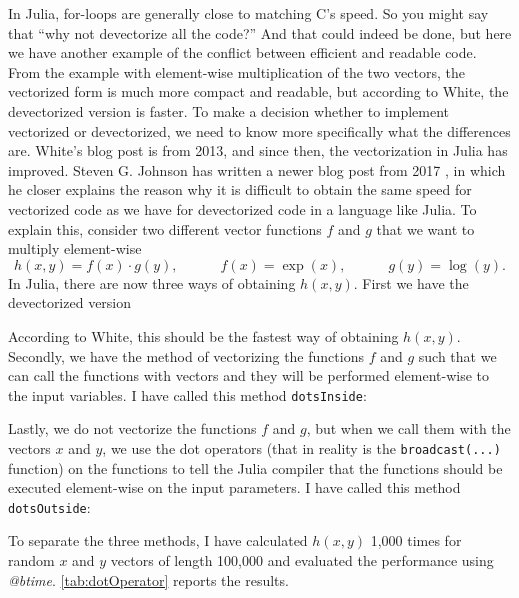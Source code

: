In Julia, for-loops are generally close to matching C's speed. So you might say that \enquote{why not devectorize all the code?} And that could indeed be done, but here we have another example of the conflict between efficient and readable code. From the example with element-wise multiplication of the two vectors, the vectorized form is much more compact and readable, but according to White, the devectorized version is faster. To make a decision whether to implement vectorized or devectorized, we need to know more specifically what the differences are. White's blog post is from 2013, and since then, the vectorization in Julia has improved. Steven G. Johnson has written a newer blog post from 2017 \emph{\citep{MoreDotsJuliaBlog}}, in which he closer explains the reason why it is difficult to obtain the same speed for vectorized code as we have for devectorized code in a language like Julia. To explain this, consider two different vector functions $f$ and $g$ that we want to multiply element-wise
\begin{equation*}
    h(x,y) = f(x) \cdot g(y), \hspace{3em} f(x) = \exp(x), \hspace{3em} g(y) = \log(y).
\end{equation*}
In Julia, there are now three ways of obtaining $h(x,y)$. First we have the devectorized version 

According to White, this should be the fastest way of obtaining $h(x,y)$. Secondly, we have the method of vectorizing the functions $f$ and $g$ such that we can call the functions with vectors and they will be performed element-wise to the input variables. I have called this method \texttt{dotsInside}:

Lastly, we do not vectorize the functions $f$ and $g$, but when we call them with the vectors $x$ and $y$, we use the dot operators (that in reality is the \texttt{broadcast(...)} function) on the functions to tell the Julia compiler that the functions should be executed element-wise on the input parameters. I have called this method \texttt{dotsOutside}:

To separate the three methods, I have calculated $h(x,y)$ 1,000 times for random $x$ and $y$ vectors of length 100,000 and evaluated the performance using \textit{@btime}. \autoref{tab:dotOperator} reports the results.

